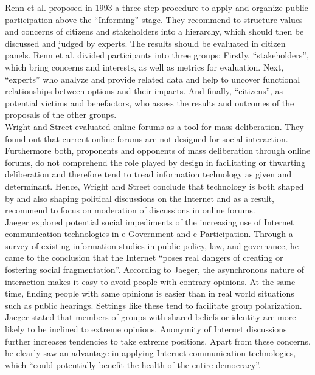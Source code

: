 Renn et al. \cite{Renn1993_participation} proposed in 1993 a three step procedure to apply and organize public participation above the ``Informing'' stage. They recommend to structure values and concerns of citizens and stakeholders into a hierarchy, which should then be discussed and judged by experts. The results should be evaluated in citizen panels. Renn et al. divided participants into three groups: Firstly, ``stakeholders'', which bring concerns and interests, as well as metrics for evaluation. Next, ``experts'' who analyze and provide related data and help to uncover functional relationships between options and their impacts. And finally, ``citizens'', as potential victims and benefactors, who assess the results and outcomes of the proposals of the other groups.\\
Wright and Street \cite{Wright2007_deliberation_design} evaluated online forums as a tool for mass deliberation. They found out that current online forums are not designed for social interaction. Furthermore both, proponents and opponents of mass deliberation through online forums, do not comprehend the role played by design in facilitating or thwarting deliberation and therefore tend to tread information technology as given and determinant. Hence, Wright and Street conclude that technology is both shaped by and also shaping political discussions on the Internet and as a result, recommend to focus on moderation of discussions in online forums.\\
Jaeger \cite{Jaeger2005_deliberate_democracy_and_egovernment} explored potential social impediments of the increasing use of Internet communication technologies in e-Government and e-Participation. Through a survey of existing information studies in public policy, law, and governance, he came to the conclusion that the Internet ``poses real dangers of creating or fostering social fragmentation''. According to Jaeger, the asynchronous nature of interaction makes it easy to avoid people with contrary opinions. At the same time, finding people with same opinions is easier than in real world situations such as public hearings. Settings like these tend to facilitate group polarization. Jaeger stated that members of groups with shared beliefs or identity are more likely to be inclined to extreme opinions. Anonymity of Internet discussions further increases tendencies to take extreme positions. Apart from these concerns, he clearly saw an advantage in applying Internet communication technologies, which ``could potentially benefit the health of the entire democracy''.\\
